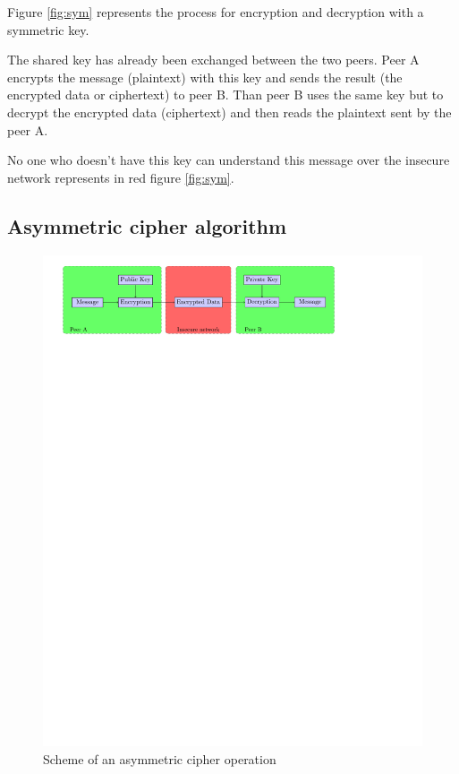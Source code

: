 Figure \ref{fig:sym} represents the process for encryption and decryption with a
symmetric key.

The shared key has already been exchanged between the two peers.\newline
Peer A encrypts the message (plaintext) with this key and sends the result (the
encrypted data or ciphertext) to peer B.\newline
Than peer B uses the same key but to decrypt the encrypted data (ciphertext) and
then reads the plaintext sent by the peer A.\newline


No one who doesn't have this key can understand this message over the insecure
network represents in red figure \ref{fig:sym}.



\newpage

\subsection{Asymmetric cipher algorithm}
\label{intro_asym_cipher}


\begin{figure}[!ht]
\centering
\includegraphics[trim=1cm 23.25cm 4cm 0cm]{figures/asym_cipher.pdf}
\caption{Scheme of an asymmetric cipher operation}
\label{fig:asym}

\end{figure}

